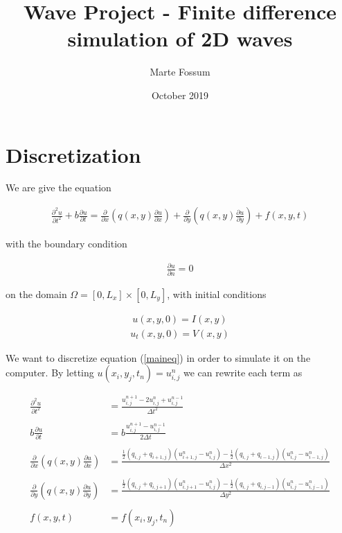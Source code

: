 \documentclass[12pt, a4paper]{article}
\title{Wave Project - Finite difference simulation of 2D waves}
\date{October 2019}
\author{Marte Fossum}
\begin{document}
\maketitle
\newpage

{\setlength{\parindent}{0cm}

\section*{Discretization}

We are give the equation 

\begin{align}
    \frac{\partial^{2} u}{\partial t^{2}}+b \frac{\partial u}{\partial t}=\frac{\partial}{\partial x}\left(q(x, y) \frac{\partial u}{\partial x}\right)+\frac{\partial}{\partial y}\left(q(x, y) \frac{\partial u}{\partial y}\right)+f(x, y, t)
    \label{maineq}
\end{align} 

with the boundary condition

\begin{align*}
    \frac{\partial u}{\partial n} = 0
\end{align*}

on the domain \(\Omega = [0, L_x] \times [0, L_y]\), with initial conditions 

\begin{align}\label{icu}
    u(x, y, 0) =I(x, y) 
\end{align}
\begin{align}\label{icuder}
    u_{t}(x, y, 0) =V(x, y) 
\end{align}

We want to discretize equation (\ref{maineq}) in order to simulate it on the computer. By letting \(u(x_i, y_j, t_n) = u_{i, j}^n\) we can rewrite each term as

\begin{align*}
    \frac{\partial^2 u}{\partial t^2} &= \frac{u_{i,j}^{n+1} - 2u_{i,j}^n + u_{i,j}^{n-1}}{\Delta t^2} \\\\ 
    b\frac{\partial u}{\partial t} &= b\frac{u_{i,j}^{n+1}- u_{i,j}^{n-1}}{2\Delta t} \\\\
    \frac{\partial}{\partial x}\left(q(x, y) \frac{\partial u}{\partial x}\right) &= \frac{\frac{1}{2}(q_{i,j} + q_{i+1,j})(u_{i+1,j}^n - u_{i,j}^n) - \frac{1}{2}(q_{i,j} + q_{i-1,j})(u_{i,j}^{n} - u_{i-1,j}^{n})}{\Delta x^2} \\\\
    \frac{\partial}{\partial y}\left(q(x, y) \frac{\partial u}{\partial y}\right) &= \frac{\frac{1}{2}(q_{i,j} + q_{i,j+1})(u_{i,j+1}^n - u_{i,j}^n) - \frac{1}{2}(q_{i,j} + q_{i,j-1})(u_{i,j}^{n} - u_{i,j-1}^{n})}{\Delta y^2} \\\\
    f(x, y, t) &= f(x_i, y_j, t_n) \\\\
\end{align*}

}
\end{document}
